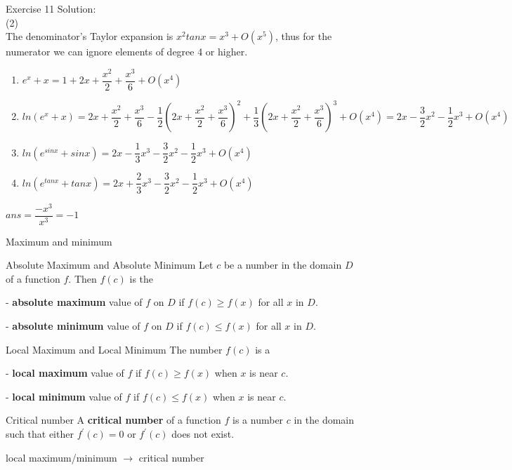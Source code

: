 \documentclass{beamer}
\begin{document}
\begin{frame}{Exercise 11}
    Solution:\\
    (2)\\
    The denominator's Taylor expansion is $x^2tanx=x^3+O(x^5)$, thus for the numerator we can ignore elements of degree 4 or higher.\\
    \begin{enumerate}
        \item $e^x+x=1+2x+\dfrac{x^2}{2}+\dfrac{x^3}{6}+O(x^4)$
        \item $ln(e^x+x)=2x+\dfrac{x^2}{2}+\dfrac{x^3}{6}-\dfrac{1}{2}(2x+\dfrac{x^2}{2}+\dfrac{x^3}{6})^2+\dfrac{1}{3}(2x+\dfrac{x^2}{2}+\dfrac{x^3}{6})^3+O(x^4)=2x-\dfrac{3}{2}x^2-\dfrac{1}{2}x^3+O(x^4)$
        \item $ln(e^{sinx}+sinx)=2x-\dfrac{1}{3}x^3-\dfrac{3}{2}x^2-\dfrac{1}{2}x^3+O(x^4)$
        \item$ln(e^{tanx}+tanx)=2x+\dfrac{2}{3}x^3-\dfrac{3}{2}x^2-\dfrac{1}{2}x^3+O(x^4)$
    \end{enumerate}
    \begin{center}
        $ans=\dfrac{-x^3}{x^3}=-1$
    \end{center}
\normalsize
    
\end{frame}
\begin{frame}{Maximum and minimum}
     \begin{block}{Absolute Maximum and Absolute Minimum}
Let $c$ be a number in the domain $D$ of a function $f$. Then $f(c)$ is the 

- \textbf{absolute maximum} value of $f$ on $D$ if $f(c) \geqslant f(x)$ for all $x$ in $D$. 

- \textbf{absolute minimum} value of $f$ on $D$ if $f(c) \leqslant f(x)$ for all $x$ in $D$.
    \end{block}
    \begin{block}{Local Maximum and Local Minimum}
The number $f(c)$ is a

- \textbf{local maximum} value of $f$ if $f(c) \geqslant f(x)$ when $x$ is near $c$.

- \textbf{local minimum} value of $f$ if $f(c) \leqslant f(x)$ when $x$ is near $c$.
    \end{block}
    \begin{block}{Critical number}
        A \textbf{critical number} of a function $f$ is a number $c$ in the domain such that either $f^\prime (c)=0$ or $f^\prime (c)$ does not exist.
    \end{block}
    local maximum/minimum $\rightarrow$ critical number
\end{frame}
\end{document}
